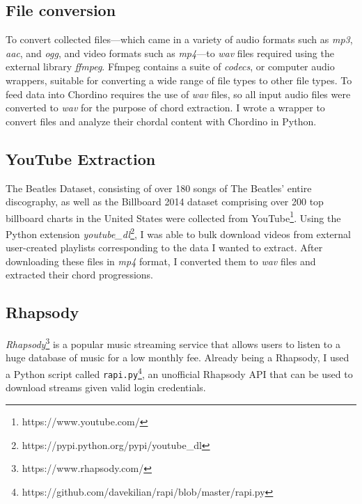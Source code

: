 \subsection{File conversion}

To convert collected files---which came in a variety of audio formats such as \textit{mp3}, \textit{aac}, and \textit{ogg}, and video formats such as \textit{mp4}---to \textit{wav} files required using the external library \textit{ffmpeg}. Ffmpeg contains a suite of \textit{codecs}, or computer audio wrappers, suitable for converting a wide range of file types to other file types. To feed data into Chordino requires the use of \textit{wav} files, so all input audio files were converted to \textit{wav} for the purpose of chord extraction. I wrote a wrapper to convert files and analyze their chordal content with Chordino in Python.

\subsection{YouTube Extraction}

The Beatles Dataset, consisting of over 180 songs of The Beatles' entire discography, as well as the Billboard 2014 dataset comprising over 200 top billboard charts in the United States were collected from YouTube\footnote{https://www.youtube.com/}. Using the Python extension \textit{youtube\_dl}\footnote{https://pypi.python.org/pypi/youtube\_dl}, I was able to bulk download videos from external user-created playlists corresponding to the data I wanted to extract. After downloading these files in \textit{mp4} format, I converted them to \textit{wav} files and extracted their chord progressions.

\subsection{Rhapsody}

\textit{Rhapsody}\footnote{https://www.rhapsody.com/} is a popular music streaming service that allows users to listen to a huge database of music for a low monthly fee. Already being a Rhapsody, I used a Python script called \texttt{rapi.py}\footnote{https://github.com/davekilian/rapi/blob/master/rapi.py}, an unofficial Rhapsody API that can be used to download streams given valid login credentials.


